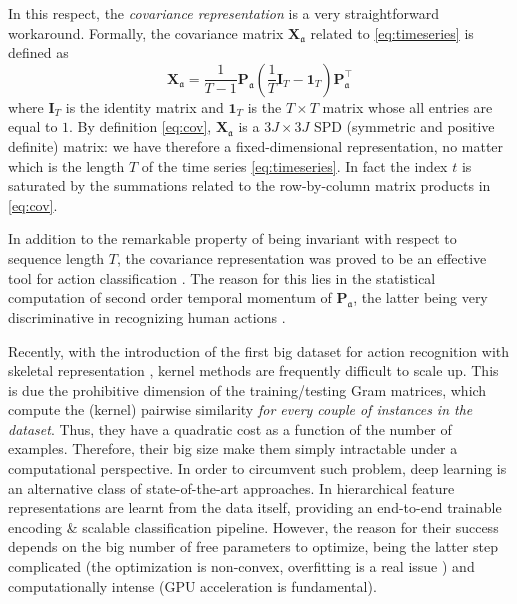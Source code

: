 \documentclass[10pt,twocolumn]{article}
\begin{document}
In this respect, the \textit{covariance representation} is a very straightforward workaround. Formally, the covariance matrix $\mathbf{X}_\mathfrak{a}$ related to \eqref{eq:timeseries} is defined as
\begin{equation}\label{eq:cov}
\mathbf{X}_\mathfrak{a} = \dfrac{1}{T - 1} \mathbf{P}_\mathfrak{a} \left( \dfrac{1}{T}\mathbf{I}_{T} - \mathbf{1}_{T} \right) \mathbf{P}_\mathfrak{a}^\top
\end{equation}
where $\mathbf{I}_{T}$ is the identity matrix and $\mathbf{1}_{T}$ is the $T \times T$ matrix whose all entries are equal to $1$. By definition \eqref{eq:cov}, $\mathbf{X}_\mathfrak{a}$ is a $3J \times 3J$ SPD (symmetric and positive definite) matrix: we have therefore a fixed-dimensional representation, no matter which is the length $T$ of the time series \eqref{eq:timeseries}. In fact the index $t$ is saturated by the summations related to the row-by-column matrix products in \eqref{eq:cov}. 

In addition to the remarkable property of being invariant with respect to sequence length $T$, the covariance representation was proved to be an effective tool for action classification \cite{egizi,Harandi:CVPR14,Wang:ICCV15,Minh:CVPR16,Cavazza:ICPR16}. The reason for this lies in the statistical computation of second order temporal momentum of $\mathbf{P}_\mathfrak{a}$, the latter being very discriminative in recognizing human actions \cite{egizi,Wang:ICCV15,Cavazza:ICPR16}.



Recently, with the introduction of the first big dataset for action recognition with skeletal representation \cite{Shahroudy:CVPR16}, kernel methods are frequently difficult to scale up. This is due the prohibitive dimension of the training/testing Gram matrices, which compute the (kernel) pairwise similarity \emph{for every couple of instances in the dataset}. Thus, they have a quadratic cost as a function of the number of examples. Therefore, their big size make them simply intractable under a computational perspective. In order to circumvent such problem, deep learning is an alternative class of state-of-the-art approaches. In \cite{Du:CVPR15,deeplie,Shahroudy:CVPR16,Liu:ECCV16} hierarchical feature representations are learnt from the data itself, providing an end-to-end trainable encoding \& scalable classification pipeline. However, the reason for their success depends on the big number of free parameters to optimize, being the latter step complicated (the optimization is non-convex, overfitting is a real issue \cite{CV}) and computationally intense (GPU acceleration is fundamental).
\end{document}
